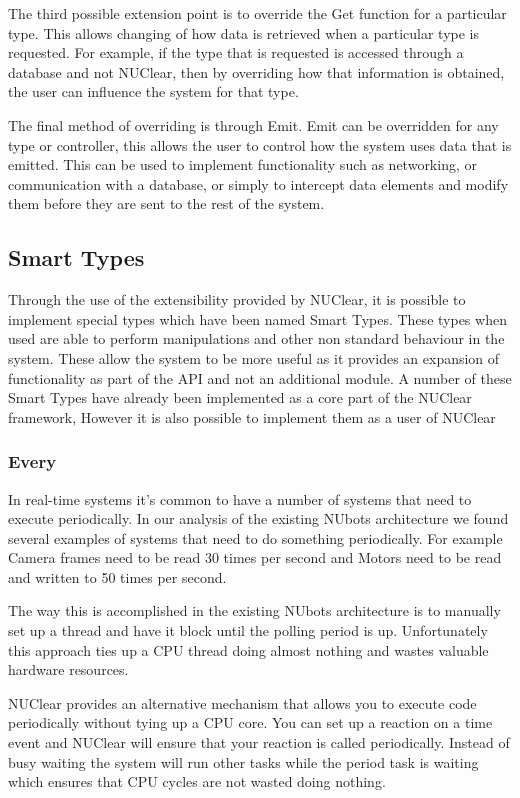 \documentclass[english,12pt]{scrartcl}
\begin{document}
			The third possible extension point is to override the Get function for a particular type.
			This allows changing of how data is retrieved when a particular type is requested.
			For example, if the type that is requested is accessed through a database and not NUClear, then by overriding how that information is obtained, the user can influence the system for that type.

			The final method of overriding is through Emit.
			Emit can be overridden for any type or controller, this allows the user to control how the system uses data that is emitted.
			This can be used to implement functionality such as networking, or communication with a database, or simply to intercept data elements and modify them before they are sent to the rest of the system.

		\subsection{Smart Types}
			Through the use of the extensibility provided by NUClear, it is possible to implement special types which have been named Smart Types.
			These types when used are able to perform manipulations and other non standard behaviour in the system.
			These allow the system to be more useful as it provides an expansion of functionality as part of the API and not an additional module.
			A number of these Smart Types have already been implemented as a core part of the NUClear framework, However it is also possible to implement them as a user of NUClear

			\subsubsection{Every}
				In real-time systems it's common to have a number of systems that need to execute periodically.
				In our analysis of the existing NUbots architecture we found several examples of systems that need to do something periodically.
				For example Camera frames need to be read 30 times per second and Motors need to be read and written to 50 times per second.

				The way this is accomplished in the existing NUbots architecture is to manually set up a thread and have it block until the polling period is up.
				Unfortunately this approach ties up a CPU thread doing almost nothing and wastes valuable hardware resources.

				NUClear provides an alternative mechanism that allows you to execute code periodically without tying up a CPU core.
				You can set up a reaction on a time event and NUClear will ensure that your reaction is called periodically.
				Instead of busy waiting the system will run other tasks while the period task is waiting which ensures that CPU cycles are not wasted doing nothing.
\end{document}
